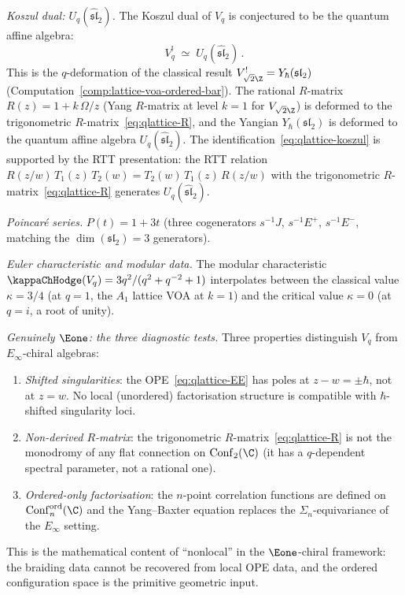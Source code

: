 \begin{conjecture}
\smallskip
\noindent
\emph{Koszul dual: $U_q(\widehat{\mathfrak{sl}}_2)$.}
The Koszul dual of $V_q$ is conjectured to be the
quantum affine algebra:
\begin{equation}\label{eq:qlattice-koszul}
V_q^!
\;\simeq\;
U_q(\widehat{\mathfrak{sl}}_2)\,.
\end{equation}
This is the $q$-deformation of the classical result
$V_{\sqrt{2}\Z}^! = Y_\hbar(\mathfrak{sl}_2)$
(Computation~\ref{comp:lattice-voa-ordered-bar}).
The rational $R$-matrix $R(z) = 1 + k\,\Omega/z$
(Yang $R$-matrix at level $k=1$ for $V_{\sqrt{2}\Z}$)
is deformed to the trigonometric
$R$-matrix~\eqref{eq:qlattice-R}, and the Yangian
$Y_\hbar(\mathfrak{sl}_2)$ is deformed to the quantum
affine algebra $U_q(\widehat{\mathfrak{sl}}_2)$.
The identification~\eqref{eq:qlattice-koszul} is
supported by the RTT presentation: the RTT relation
$R(z/w)\,T_1(z)\,T_2(w) = T_2(w)\,T_1(z)\,R(z/w)$
with the trigonometric $R$-matrix~\eqref{eq:qlattice-R}
generates $U_q(\widehat{\mathfrak{sl}}_2)$.

\smallskip
\noindent
\emph{Poincar\'{e} series.}
$P(t) = 1 + 3t$ (three cogenerators $s^{-1}J$,
$s^{-1}E^+$, $s^{-1}E^-$, matching the
$\dim(\mathfrak{sl}_2) = 3$ generators).

\smallskip
\noindent
\emph{Euler characteristic and modular data.}
The modular characteristic $\kappaChHodge(V_q) = 3q^2/(q^2 + q^{-2} + 1)$
interpolates between the classical value $\kappa = 3/4$
(at $q = 1$, the $A_1$ lattice VOA at $k = 1$) and the
critical value $\kappa = 0$ (at $q = i$, a root of unity).

\smallskip
\noindent
\emph{Genuinely $\Eone$: the three diagnostic tests.}
Three properties distinguish $V_q$ from
$E_\infty$-chiral algebras:
\begin{enumerate}[label=\textup{(\roman*)},nosep]
\item \emph{Shifted singularities}: the OPE~\eqref{eq:qlattice-EE}
 has poles at $z - w = \pm\hbar$, not at $z = w$. No local
 (unordered) factorisation structure is compatible with
 $\hbar$-shifted singularity loci.
\item \emph{Non-derived $R$-matrix}: the trigonometric
 $R$-matrix~\eqref{eq:qlattice-R} is not the monodromy
 of any flat connection on $\Conf_2(\C)$ (it has a
 $q$-dependent spectral parameter, not a rational one).
\item \emph{Ordered-only factorisation}: the $n$-point
 correlation functions are defined on
 $\Conf_n^{\mathrm{ord}}(\C)$ and the Yang--Baxter
 equation replaces the $\Sigma_n$-equivariance of
 the $E_\infty$ setting.
\end{enumerate}
This is the mathematical content of ``nonlocal'' in the
$\Eone$-chiral framework: the braiding data cannot be
recovered from local OPE data, and the ordered configuration
space is the primitive geometric input.


\end{conjecture}
